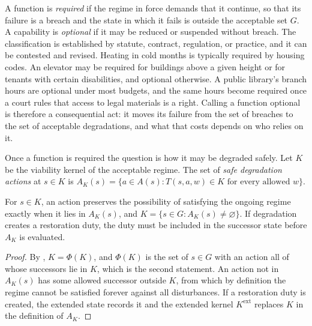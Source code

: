 A function is \emph{required} if the regime in force demands that it continue, so that its failure is a breach and the state in which it fails is outside the acceptable set $G$. A capability is \emph{optional} if it may be reduced or suspended without breach. The classification is established by statute, contract, regulation, or practice, and it can be contested and revised. Heating in cold months is typically required by housing codes. An elevator may be required for buildings above a given height or for tenants with certain disabilities, and optional otherwise. A public library's branch hours are optional under most budgets, and the same hours become required once a court rules that access to legal materials is a right. Calling a function optional is therefore a consequential act: it moves its failure from the set of breaches to the set of acceptable degradations, and what that costs depends on who relies on it.

Once a function is required the question is how it may be degraded safely. Let $K$ be the viability kernel of the acceptable regime. The set of \emph{safe degradation actions} at $s\in K$ is $A_K(s)=\{a\in A(s):T(s,a,w)\in K\text{ for every allowed }w\}$.

\begin{theorem}\label{thm:P06}
For $s\in K$, an action preserves the possibility of satisfying the ongoing regime exactly when it lies in $A_K(s)$, and $K=\{s\in G:A_K(s)\ne\varnothing\}$. If degradation creates a restoration duty, the duty must be included in the successor state before $A_K$ is evaluated.
\end{theorem}

\begin{proof}
By , $K=\Phi(K)$, and $\Phi(K)$ is the set of $s\in G$ with an action all of whose successors lie in $K$, which is the second statement. An action not in $A_K(s)$ has some allowed successor outside $K$, from which by definition the regime cannot be satisfied forever against all disturbances. If a restoration duty is created, the extended state records it and the extended kernel $K^{\mathrm{ext}}$ replaces $K$ in the definition of $A_K$.
\end{proof}

